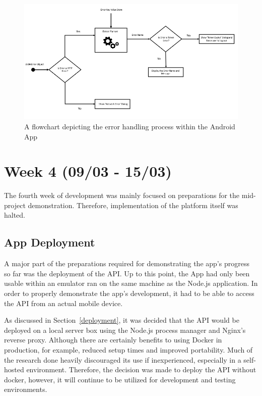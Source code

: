 \begin{figure}[!htb]
	\centering
	\includegraphics[width=\linewidth]{Resources/img/error_handling_flowchart.png}
	\caption{A flowchart depicting the error handling process within the Android App}
	\label{fig:error_flowchart}
\end{figure}

\section{Week 4 (09/03 - 15/03)}
The fourth week of development was mainly focused on preparations for the mid-project demonstration. Therefore, implementation of the platform itself was halted.

\subsection{App Deployment}
A major part of the preparations required for demonstrating the app's progress so far was the deployment of the API. Up to this point, the App had only been usable within an emulator ran on the same machine as the Node.js application. In order to properly demonstrate the app's development, it had to be able to access the API from an actual mobile device.

As discussed in Section~\ref{deployment}, it was decided that the API would be deployed on a local server box using the Node.js process manager and Nginx's reverse proxy. Although there are certainly benefits to using Docker in production, for example, reduced setup times and improved portability. Much of the research done heavily discouraged its use if inexperienced, especially in a self-hosted environment. Therefore, the decision was made to deploy the API without docker, however, it will continue to be utilized for development and testing environments.

